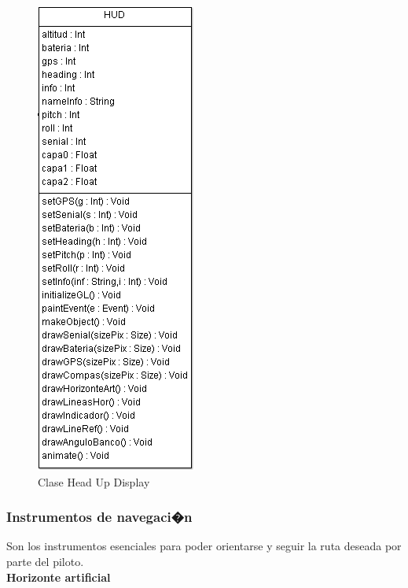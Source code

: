 \begin{figure}[h!]
	\centering
	\includegraphics[width=0.4\linewidth, height=0.5\textheight]{Imagenes/classHUD}
	\caption{Clase Head Up Display}
	\label{fig:classhud}
\end{figure}

\newpage

\subsubsection{Instrumentos de navegaci�n }
Son los instrumentos esenciales para poder orientarse y seguir la ruta deseada por parte del piloto. \\



\textbf{Horizonte artificial}

